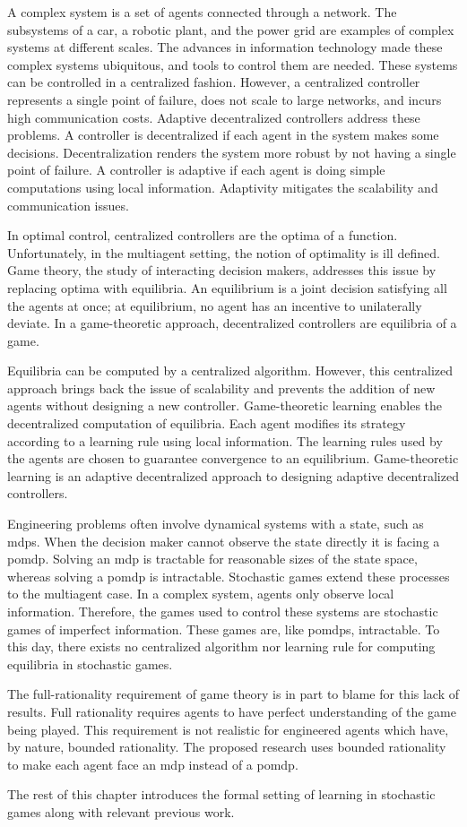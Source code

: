 A complex system is a set of agents connected through a network.
The subsystems of a car, a robotic plant, and the power grid are examples of complex systems at different scales.
The advances in information technology made these complex systems ubiquitous, and tools to control them are needed.
These systems can be controlled in a centralized fashion.
However, a centralized controller represents a single point of failure, does not scale to large networks, and incurs high communication costs.
Adaptive decentralized controllers address these problems.
A controller is decentralized if each agent in the system makes some decisions.
Decentralization renders the system more robust by not having a single point of failure.
A controller is adaptive if each agent is doing simple computations using local information.
Adaptivity mitigates the scalability and communication issues.

In optimal control, centralized controllers are the optima of a function.
Unfortunately, in the multiagent setting, the notion of optimality is ill defined.
Game theory, the study of interacting decision makers, addresses this issue by replacing optima with equilibria.
An equilibrium is a joint decision satisfying all the agents at once; at equilibrium, no agent has an incentive to unilaterally deviate.
In a game-theoretic approach, decentralized controllers are equilibria of a game.

Equilibria can be computed by a centralized algorithm.
However, this centralized approach brings back the issue of scalability and prevents the addition of new agents without designing a new controller.
Game-theoretic learning enables the decentralized computation of equilibria.
Each agent modifies its strategy according to a learning rule using local information.
The learning rules used by the agents are chosen to guarantee convergence to an equilibrium.
Game-theoretic learning is an adaptive decentralized approach to designing adaptive decentralized controllers.

Engineering problems often involve dynamical systems with a state, such as \acp{mdp}.
When the decision maker cannot observe the state directly it is facing a \ac{pomdp}.
Solving an \ac{mdp} is tractable for reasonable sizes of the state space, whereas solving a \ac{pomdp} is intractable.
Stochastic games extend these processes to the multiagent case.
In a complex system, agents only observe local information.
Therefore, the games used to control these systems are stochastic games of imperfect information.
These games are, like \acp{pomdp}, intractable.
To this day, there exists no centralized algorithm nor learning rule for computing equilibria in stochastic games.

The full-rationality requirement of game theory is in part to blame for this lack of results.
Full rationality requires agents to have perfect understanding of the game being played.
This requirement is not realistic for engineered agents which have, by nature, bounded rationality.
The proposed research uses bounded rationality to make each agent face an \ac{mdp} instead of a \ac{pomdp}.

The rest of this chapter introduces the formal setting of learning in stochastic games along with relevant previous work.
